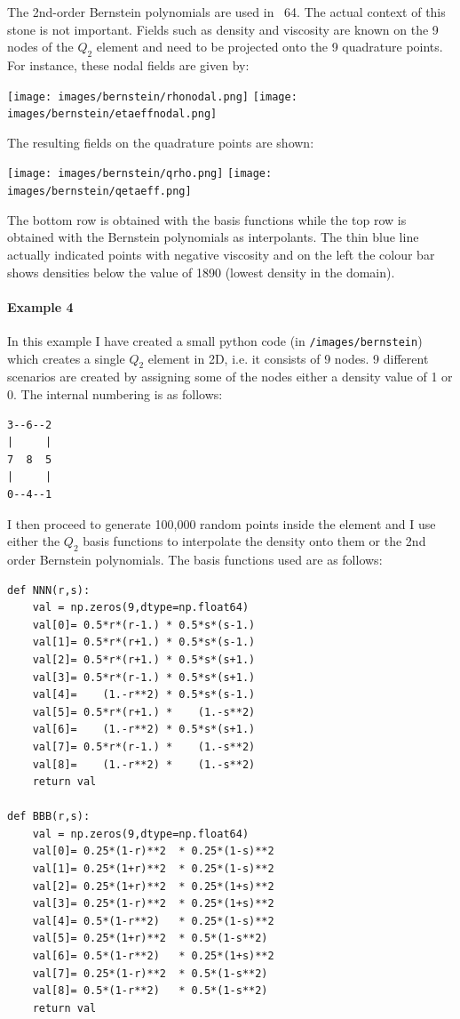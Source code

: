 The 2nd-order Bernstein polynomials are used in \stone~64. The actual context of this stone is not 
important. Fields such as density and viscosity are known on the 
9 nodes of the $Q_2$ element and need to be projected onto the 9 quadrature points. 
For instance, these nodal fields are given by:
\begin{center}
\texttt{[image: images/bernstein/rhonodal.png]}
\texttt{[image: images/bernstein/etaeffnodal.png]}
\end{center}
The resulting fields on the quadrature points are shown:
\begin{center}
\texttt{[image: images/bernstein/qrho.png]}
\texttt{[image: images/bernstein/qetaeff.png]}
\end{center}
The bottom row is obtained with the basis functions while the top row is obtained with the Bernstein 
polynomials as interpolants. The thin blue line actually indicated points with negative viscosity and 
on the left the colour bar shows densities below the value of 1890 (lowest density in the domain).

\paragraph{Example 4}

In this example I have created a small python code (in {\tt /images/bernstein})
which creates a single $Q_2$ element in 2D, i.e. it consists of 9 nodes.
9 different scenarios are created by assigning some of the nodes either a 
density value of 1 or 0. 
The internal numbering is as follows:
\begin{verbatim}
3--6--2
|     |
7  8  5
|     |
0--4--1
\end{verbatim}

I then proceed to generate 100,000 random points inside the element
and I use either the $Q_2$ basis functions to interpolate the density onto them
or the 2nd order Bernstein polynomials.
The basis functions used are as follows:
\begin{lstlisting}
def NNN(r,s):
    val = np.zeros(9,dtype=np.float64)
    val[0]= 0.5*r*(r-1.) * 0.5*s*(s-1.)
    val[1]= 0.5*r*(r+1.) * 0.5*s*(s-1.)
    val[2]= 0.5*r*(r+1.) * 0.5*s*(s+1.)
    val[3]= 0.5*r*(r-1.) * 0.5*s*(s+1.)
    val[4]=    (1.-r**2) * 0.5*s*(s-1.)
    val[5]= 0.5*r*(r+1.) *    (1.-s**2)
    val[6]=    (1.-r**2) * 0.5*s*(s+1.)
    val[7]= 0.5*r*(r-1.) *    (1.-s**2)
    val[8]=    (1.-r**2) *    (1.-s**2)
    return val 

def BBB(r,s):
    val = np.zeros(9,dtype=np.float64)
    val[0]= 0.25*(1-r)**2  * 0.25*(1-s)**2  
    val[1]= 0.25*(1+r)**2  * 0.25*(1-s)**2  
    val[2]= 0.25*(1+r)**2  * 0.25*(1+s)**2  
    val[3]= 0.25*(1-r)**2  * 0.25*(1+s)**2  
    val[4]= 0.5*(1-r**2)   * 0.25*(1-s)**2  
    val[5]= 0.25*(1+r)**2  * 0.5*(1-s**2) 
    val[6]= 0.5*(1-r**2)   * 0.25*(1+s)**2  
    val[7]= 0.25*(1-r)**2  * 0.5*(1-s**2) 
    val[8]= 0.5*(1-r**2)   * 0.5*(1-s**2) 
    return val 
\end{lstlisting}


